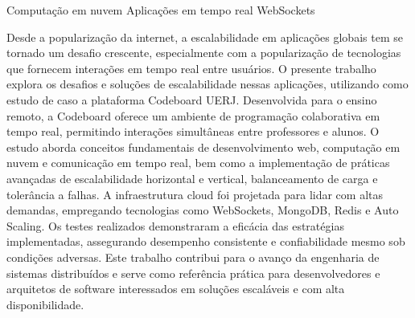 {Computação em nuvem}
{Aplicações em tempo real}
{WebSockets}



Desde a popularização da internet, a escalabilidade em aplicações globais tem se tornado um desafio crescente, especialmente com a popularização de tecnologias que fornecem interações em tempo real entre usuários. O presente trabalho explora os desafios e soluções de escalabilidade nessas aplicações, utilizando como estudo de caso a plataforma Codeboard UERJ. Desenvolvida para o ensino remoto, a Codeboard oferece um ambiente de programação colaborativa em tempo real, permitindo interações simultâneas entre professores e alunos. O estudo aborda conceitos fundamentais de desenvolvimento web, computação em nuvem e comunicação em tempo real, bem como a implementação de práticas avançadas de escalabilidade horizontal e vertical, balanceamento de carga e tolerância a falhas. A infraestrutura cloud foi projetada para lidar com altas demandas, empregando tecnologias como WebSockets, MongoDB, Redis e Auto Scaling. Os testes realizados demonstraram a eficácia das estratégias implementadas, assegurando desempenho consistente e confiabilidade mesmo sob condições adversas. Este trabalho contribui para o avanço da engenharia de sistemas distribuídos e serve como referência prática para desenvolvedores e arquitetos de software interessados em soluções escaláveis e com alta disponibilidade.


\imprimirchaves %



